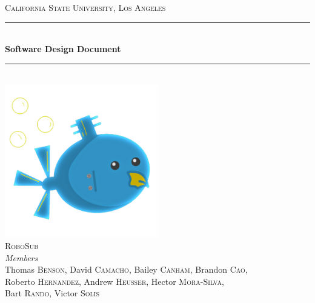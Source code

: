 \documentclass[11pt]{article}
\begin{document}
\begin{titlepage} 

	\newcommand{\HRule}{\rule{\linewidth}{0.5mm}} 
	\center %

	\textsc{\LARGE California State University, Los Angeles}\\[1.5cm] 

	\HRule\\[0.4cm]
    {\huge\bfseries Software Design Document}\\[0.4cm] 
	\HRule\\[1.5cm]

	\vfill\vfill
	\includegraphics[width=0.5\textwidth]{../robosub_logo.png}\\[1cm] 

	\textsc{\Large RoboSub}\\[0.5cm] 

	{\large\textit{Members}}\\
	Thomas \textsc{Benson},
	David \textsc{Camacho},
	Bailey \textsc{Canham},
	Brandon \textsc{Cao},\\
	Roberto \textsc{Hernandez},
	Andrew \textsc{Heusser},
    Hector \textsc{Mora-Silva},\\
	Bart \textsc{Rando},
	Victor \textsc{Solis}


\end{titlepage}
\end{document}
